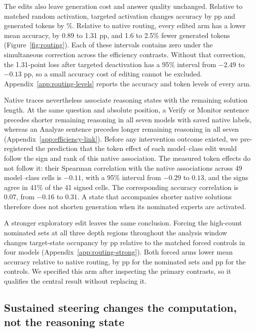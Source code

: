 The edits also leave generation cost and answer quality unchanged.
%
Relative to matched random activation, targeted activation changes accuracy by  pp and generated tokens by \%.
%
Relative to native routing, every edited arm has a lower mean accuracy, by 0.89 to 1.31 pp, and 1.6 to 2.5\% fewer generated tokens (Figure~\ref{fig:routing}).
%
Each of these intervals contains zero under the simultaneous correction across the efficiency contrasts.
%
Without that correction, the 1.31-point loss after targeted deactivation has a 95\% interval from $-2.49$ to $-0.13$ pp, so a small accuracy cost of editing cannot be excluded.
%
Appendix~\ref{app:routing-levels} reports the accuracy and token levels of every arm.
%

Native traces nevertheless associate reasoning states with the remaining solution length.
%
At the same question and absolute position, a Verify or Monitor sentence precedes shorter remaining reasoning in all seven models with saved native labels, whereas an Analyze sentence precedes longer remaining reasoning in all seven (Appendix~\ref{app:efficiency-link}).
%
Before any intervention outcome existed, we pre-registered the prediction that the token effect of each model--class edit would follow the sign and rank of this native association.
%
The measured token effects do not follow it: their Spearman correlation with the native associations across 49 model--class cells is $-0.11$, with a 95\% interval from $-0.29$ to $0.13$, and the signs agree in 41\% of the 41 signed cells.
%
The corresponding accuracy correlation is $0.07$, from $-0.16$ to $0.31$.
%
A state that accompanies shorter native solutions therefore does not shorten generation when its nominated experts are activated.
%

A stronger exploratory edit leaves the same conclusion.
%
Forcing the high-count nominated sets at all three depth regions throughout the analysis window changes target-state occupancy by  pp relative to the matched forced controls in four models (Appendix~\ref{app:routing-strong}).
%
Both forced arms lower mean accuracy relative to native routing, by  pp for the nominated sets and  pp for the controls.
%
We specified this arm after inspecting the primary contrasts, so it qualifies the central result without replacing it.
%

\subsection{Sustained steering changes the computation, not the reasoning state}
\label{sec:whole-results}

